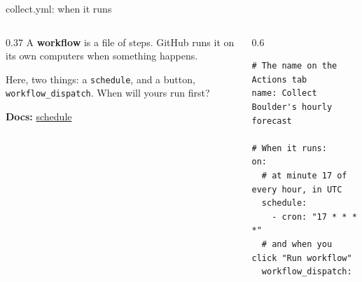\documentclass[9pt,aspectratio=169]{beamer}
\begin{document}
\begin{frame}[fragile]{collect.yml: when it runs}
    \begin{columns}[T]
        \begin{column}{0.37\textwidth}
            A \textbf{workflow} is a file of steps. GitHub runs it on its own computers when something happens.

            \medskip
            Here, two things: a \texttt{schedule}, and a button, \texttt{workflow\_dispatch}. When will yours run first?

            \medskip
            {\scriptsize\textbf{Docs:} \href{https://docs.github.com/en/actions/reference/workflows-and-actions/events-that-trigger-workflows\#schedule}{schedule}\par}
        \end{column}
        \begin{column}{0.6\textwidth}
\begin{lstlisting}[language={}]
# The name on the Actions tab
name: Collect Boulder's hourly forecast

# When it runs:
on:
  # at minute 17 of every hour, in UTC
  schedule:
    - cron: "17 * * * *"
  # and when you click "Run workflow"
  workflow_dispatch:
\end{lstlisting}
        \end{column}
    \end{columns}
\end{frame}
\end{document}
